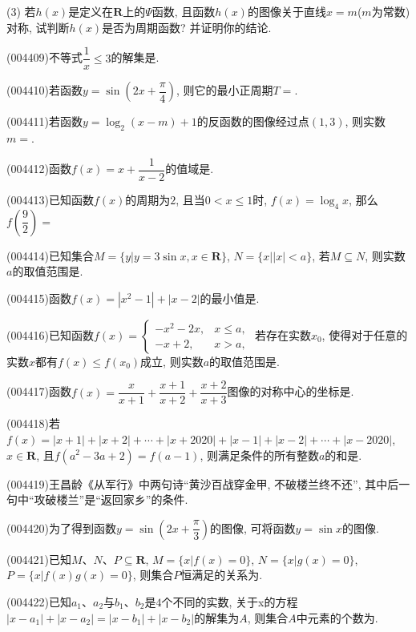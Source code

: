 (3) 若$h(x)$是定义在$\mathbf{R}$上的$\Psi$函数, 且函数$h(x)$的图像关于直线$x=m$($m$为常数)对称, 试判断$h(x)$是否为周期函数? 并证明你的结论.
\item (004409)不等式$\dfrac 1x\le 3$的解集是.
\item (004410)若函数$y=\sin (2x+\dfrac{\pi }4)$, 则它的最小正周期$T=$.
\item (004411)若函数$y=\log_2(x-m)+1$的反函数的图像经过点$(1,3)$, 则实数$m=$.
\item (004412)函数$f(x)=x+\dfrac 1{x-2}$的值域是.
\item (004413)已知函数$f(x)$的周期为$2$, 且当$0<x\le 1$时, $f(x)=\log_4x$, 那么$f(\dfrac 92)=$
\item (004414)已知集合$M=\{y|y=3\sin x,x\in \mathbf{R}\}$, $N=\{x||x|<a\}$, 若$M\subseteq N$, 则实数$a$的取值范围是.
\item (004415)函数$f(x)=|x^2-1|+|x-2|$的最小值是.
\item (004416)已知函数$f(x)=\begin{cases}  -x^2-2x, & x\le a,  \\-x+2, &x>a,  \end{cases}$ 若存在实数$x_0$, 使得对于任意的实数$x$都有$f(x)\le f(x_0)$成立, 则实数$a$的取值范围是.
\item (004417)函数$f(x)=\dfrac x{x+1}+\dfrac{x+1}{x+2}+\dfrac{x+2}{x+3}$图像的对称中心的坐标是.
\item (004418)若$f(x)=|x+1|+|x+2|+\cdots +|x+2020|+|x-1|+|x-2|+\cdots +|x-2020|$, $x\in \mathbf{R}$, 且$f(a^2-3a+2)=f(a-1)$, 则满足条件的所有整数$a$的和是.
\item (004419)王昌龄《从军行》中两句诗``黄沙百战穿金甲, 不破楼兰终不还'', 其中后一句中``攻破楼兰''是``返回家乡''的条件.
\item (004420)为了得到函数$y=\sin (2x+\dfrac{\pi}3)$的图像, 可将函数$y=\sin x$的图像.
\item (004421)已知$M$、$N$、$P\subseteq \mathbf{R}$, $M=\{x|f(x)=0\}$, $N=\{x|g(x)=0\}$, $P=\{x|f(x)g(x)=0\}$, 则集合$P$恒满足的关系为.
\item (004422)已知$a_1$、$a_2$与$b_1$、$b_2$是$4$个不同的实数, 关于x的方程$|x-a_1|+|x-a_2|=|x-b_1|+|x-b_2|$的解集为$A$, 则集合$A$中元素的个数为.
